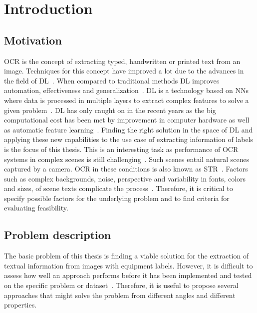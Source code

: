 \chapter{Introduction}\label{ch:intro}
\section{Motivation}
\ac{OCR} is the concept of extracting typed, handwritten or printed text
from an image.
Techniques for this concept have improved a lot due to the advances in the field of
\ac{DL}~\citep{zhao_improving_2020}.
When compared to traditional methods \ac{DL} improves automation, effectiveness and
generalization~\citep{chen_text_2021}.
\ac{DL} is a technology based on \acp{NN} where data is processed
in multiple layers to extract complex features to solve a given problem~\citep{shrestha_review_2019}.
\ac{DL} has only caught on in the recent years as the big computational cost has been met
by improvement in computer hardware as well as automatic feature
learning~\citep{ponti_everything_2017, chen_text_2021}.
Finding the right solution in the space of \ac{DL} and applying these new capabilities to
the use case of extracting information of labels is the focus of this thesis.
This is an interesting task as performance of \ac{OCR} systems in complex scenes is still
challenging~\citep{zhao_improving_2020}.
Such scenes entail natural scenes captured by a camera.
\ac{OCR} in these conditions is also known as \ac{STR}~\citep{chen_text_2021}.
Factors such as complex backgrounds, noise, perspective and variability in fonts, colors and sizes,
of scene texts complicate the process~\citep{hu_gtc_2020,chen_text_2021}.
Therefore, it is critical to specify possible factors for the underlying problem and to find
criteria for evaluating feasibility.

\section{Problem description}\label{se:problem}
The basic problem of this thesis is finding a viable solution for the extraction of textual
information from images with equipment labels.
However, it is difficult to assess how well an approach performs before it has been implemented and
tested on the specific problem or dataset~\citep{arpteg_software_2018}.
Therefore, it is useful to propose several approaches that might solve the problem from
different angles and different properties.


